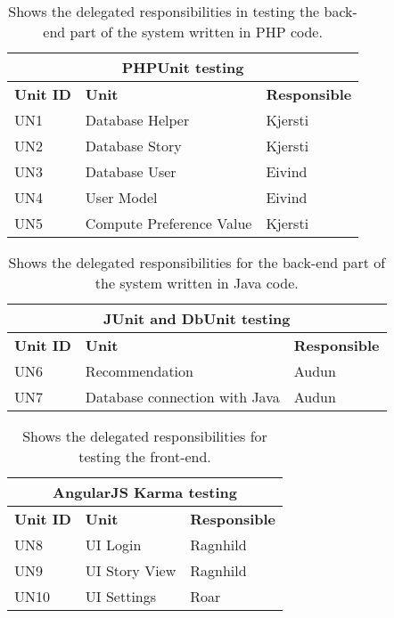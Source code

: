 \begin{table}[H]
	\caption{Shows the delegated responsibilities in testing the back-end part of the system written in PHP code.}
	\label{Tab:phptesting}
	\begin{center}
		\begin{tabular}{ | l | l | l |}
			\hline
			\multicolumn{3}{|c|}{\textbf{PHPUnit testing}} \\
			\hline
			\textbf{Unit ID} & \textbf{Unit} & \textbf{Responsible} \\ \hline
			UN1 & Database Helper & Kjersti \\ \hline
			UN2 & Database Story & Kjersti \\ \hline
			UN3 & Database User & Eivind \\ \hline
			UN4 & User Model & Eivind \\ \hline			
			UN5 & Compute Preference Value & Kjersti \\ \hline			
		\end{tabular}
	\end{center}
\end{table}

\begin{table}[H]
		\caption{Shows the delegated responsibilities for the back-end part of the system written in Java code.}
		\label{Tab:junittesting}
	\begin{center}
		\begin{tabular}{ | l | l | l |}
			\hline
			\multicolumn{3}{|c|}{\textbf{JUnit and DbUnit testing}} \\
			\hline
			\textbf{Unit ID} & \textbf{Unit} & \textbf{Responsible} \\ \hline
			UN6 & Recommendation  & Audun \\ \hline
			UN7 & Database connection with Java & Audun \\\hline			
		\end{tabular}
	\end{center}

\end{table}

\begin{table}[H]
	\caption{Shows the delegated responsibilities for testing the front-end.}
	\label{Tab:karmatesting}
	\begin{center}
		\begin{tabular}{ | l | l | l |}
			\hline
			\multicolumn{3}{|c|}{\textbf{AngularJS Karma testing}} \\
			\hline
			\textbf{Unit ID} & \textbf{Unit} & \textbf{Responsible} \\ \hline
			UN8 & UI Login & Ragnhild \\ \hline
			UN9 & UI Story View & Ragnhild \\ \hline
			UN10 & UI Settings & Roar \\ \hline
		\end{tabular}
	\end{center}

\end{table}


